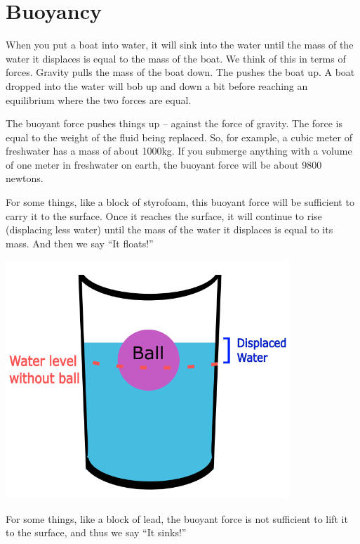 \chapter{Buoyancy}

When you put a boat into water, it will sink into the water until
the mass of the water it displaces is equal to the mass of the
boat. We think of this in terms of forces. Gravity pulls the mass of
the boat down. The  pushes the boat up. A boat
dropped into the water will bob up and down a bit before reaching an
equilibrium where the two forces are equal.

The buoyant force pushes things up -- against the force of
gravity. The force is equal to the weight of the fluid being
replaced. So, for example, a cubic meter of freshwater has a mass of
about 1000kg.  If you submerge anything with a volume of one meter in
freshwater on earth, the buoyant force will be about 9800 newtons.

For some things, like a block of styrofoam, this buoyant force will be
sufficient to carry it to the surface. Once it reaches the surface, it
will continue to rise (displacing less water) until the mass of the
water it displaces is equal to its mass. And then we say ``It floats!''

\includegraphics[width=0.8\textwidth]{Buoyancy_Displacement_Diagram.png}

For some things, like a block of lead, the buoyant force is not
 sufficient to lift it to the surface, and thus we say ``It sinks!''

